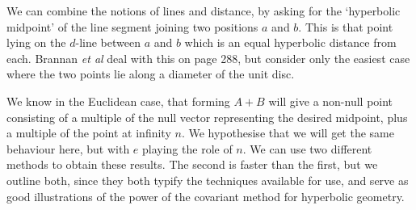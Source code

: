 We can combine the notions of lines and distance, by asking for
the `hyperbolic midpoint' of the line segment joining two
positions $a$ and $b$. This is that point lying on the $d$-line
between $a$ and $b$ which is an equal hyperbolic distance from
each. Brannan \emph{et al}\cite{GEOM:Brannan} deal with this on page 288, but
consider only the easiest case where the two points lie along a diameter of
the unit disc.

We know in the Euclidean case, that forming $A+B$ will give a
non-null point consisting of a multiple of the null vector
representing the desired midpoint, plus a multiple of the point at
infinity $n$. We hypothesise that we will get the same behaviour
here, but with $e$ playing the role of $n$. We can use two
different methods to obtain these results. The second is faster
than the first, but we outline both, since they both typify the
techniques available for use, and serve as good illustrations of
the power of the covariant method for hyperbolic geometry.

